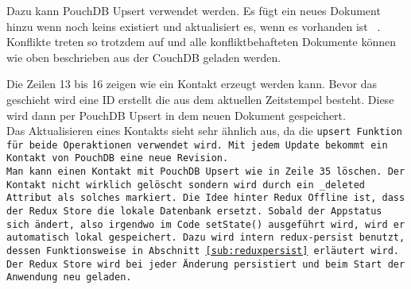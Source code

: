 Dazu kann PouchDB Upsert verwendet werden. Es fügt ein neues Dokument hinzu wenn noch keins existiert und aktualisiert es, wenn es vorhanden ist ~\cite{pouch_conflicts}. Konflikte treten so trotzdem auf und alle konfliktbehafteten Dokumente können wie oben beschrieben aus der CouchDB geladen werden.\\
%
\begin{center}
  
\end{center}
%
Die Zeilen 13 bis 16 zeigen wie ein Kontakt erzeugt werden kann. Bevor das geschieht wird eine ID erstellt die aus dem aktuellen Zeitstempel besteht. Diese wird dann per PouchDB Upsert in dem neuen Dokument gespeichert.\\
Das Aktualisieren eines Kontakts sieht sehr ähnlich aus, da die \tt{upsert} Funktion für beide Operaktionen verwendet wird.
Mit jedem Update bekommt ein Kontakt von PouchDB eine neue Revision.\\
Man kann einen Kontakt mit PouchDB Upsert wie in Zeile 35 löschen.
Der Kontakt nicht wirklich gelöscht sondern wird durch ein \tt{\_deleted} Attribut als solches markiert.
%
%
Die Idee hinter Redux Offline ist, dass der Redux Store die lokale Datenbank ersetzt. Sobald der Appstatus sich ändert, also irgendwo im Code \tt{setState()} ausgeführt wird, wird er automatisch lokal gespeichert. Dazu wird intern \tt{redux-persist} benutzt, dessen Funktionsweise in Abschnitt \ref{sub:reduxpersist} erläutert wird. Der Redux Store wird bei jeder Änderung persistiert und beim Start der Anwendung neu geladen.
